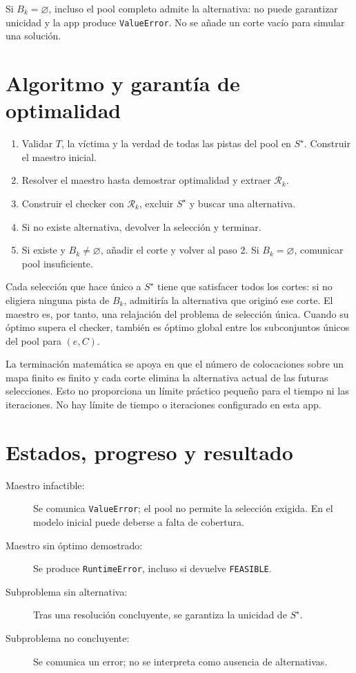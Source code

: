 \documentclass[11pt,a4paper]{article}
\begin{document}
Si $B_k=\varnothing$, incluso el pool completo admite la alternativa:
no puede garantizar unicidad y la app produce \texttt{ValueError}.
No se a\~nade un corte vac\'io para simular una soluci\'on.

\section{Algoritmo y garant\'ia de optimalidad}

\begin{enumerate}
  \item Validar $T$, la v\'ictima y la verdad de todas las pistas del
        pool en $S^\star$. Construir el maestro inicial.
  \item Resolver el maestro hasta demostrar optimalidad y extraer
        $\mathcal R_k$.
  \item Construir el checker con $\mathcal R_k$, excluir $S^\star$
        y buscar una alternativa.
  \item Si no existe alternativa, devolver la selecci\'on y terminar.
  \item Si existe y $B_k\neq\varnothing$, a\~nadir el corte y volver
        al paso 2. Si $B_k=\varnothing$, comunicar pool insuficiente.
\end{enumerate}

Cada selecci\'on que hace \'unico a $S^\star$ tiene que satisfacer
todos los cortes: si no eligiera ninguna pista de $B_k$, admitir\'ia
la alternativa que origin\'o ese corte. El maestro es, por tanto,
una relajaci\'on del problema de selecci\'on \'unica. Cuando su
\'optimo supera el checker, tambi\'en es \'optimo global entre los
subconjuntos \'unicos del pool para $(e,C)$.

La terminaci\'on matem\'atica se apoya en que el n\'umero de
colocaciones sobre un mapa finito es finito y cada corte elimina la
alternativa actual de las futuras selecciones. Esto no proporciona
un l\'imite pr\'actico peque\~no para el tiempo ni las iteraciones.
No hay l\'imite de tiempo o iteraciones configurado en esta app.

\section{Estados, progreso y resultado}

\begin{description}
  \item[Maestro infactible:] Se comunica \texttt{ValueError}; el pool
        no permite la selecci\'on exigida. En el modelo inicial puede
        deberse a falta de cobertura.
  \item[Maestro sin \'optimo demostrado:] Se produce
        \texttt{RuntimeError}, incluso si devuelve \texttt{FEASIBLE}.
  \item[Subproblema sin alternativa:] Tras una resoluci\'on concluyente,
        se garantiza la unicidad de $S^\star$.
  \item[Subproblema no concluyente:] Se comunica un error; no se
        interpreta como ausencia de alternativas.
\end{description}
\end{document}
